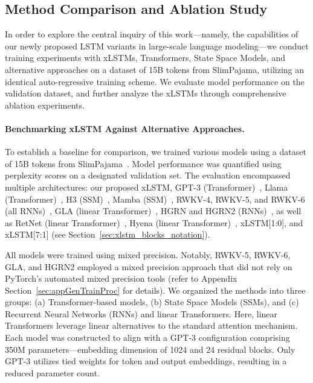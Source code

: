 \subsection{Method Comparison and Ablation Study}
\label{sec:ExpComparison}

In order to explore the central inquiry of this work—namely, the capabilities of our newly proposed LSTM variants in large-scale language modeling—we conduct training experiments with xLSTMs, Transformers, State Space Models, and alternative approaches on a dataset of 15B tokens from SlimPajama, utilizing an identical auto-regressive training scheme. We evaluate model performance on the validation dataset, and further analyze the xLSTMs through comprehensive ablation experiments.

\paragraph{Benchmarking xLSTM Against Alternative Approaches.} To establish a baseline for comparison, we trained various models using a dataset of 15B tokens from SlimPajama~\citep{Soboleva:23}. Model performance was quantified using perplexity scores on a designated validation set. The evaluation encompassed multiple architectures: our proposed xLSTM, GPT-3 (Transformer)~\citep{Brown:20short}, Llama (Transformer)~\citep{Touvron:23arxiv}, H3 (SSM)~\citep{Fu:23}, Mamba (SSM)~\citep{Gu:24arxiv}, RWKV-4, RWKV-5, and RWKV-6 (all RNNs)~\citep{Peng:23arxivshort, Peng:24arxivshort}, GLA (linear Transformer)~\citep{Yang:23arxiv}, HGRN and HGRN2 (RNNs)~\citep{Qin:23, Qin:24arxiv}, as well as RetNet (linear Transformer)~\citep{Sun:23arxiv}, Hyena (linear Transformer)~\citep{Poli:23}, xLSTM[1:0], and xLSTM[7:1] (see Section~\ref{sec:xlstm_blocks_notation}). 

All models were trained using mixed precision. Notably, RWKV-5, RWKV-6, GLA, and HGRN2 employed a mixed precision approach that did not rely on PyTorch's automated mixed precision tools (refer to Appendix Section~\ref{sec:appGenTrainProc} for details). We organized the methods into three groups: (a) Transformer-based models, (b) State Space Models (SSMs), and (c) Recurrent Neural Networks (RNNs) and linear Transformers. Here, linear Transformers leverage linear alternatives to the standard attention mechanism. Each model was constructed to align with a GPT-3 configuration comprising 350M parameters—embedding dimension of 1024 and 24 residual blocks. Only GPT-3 utilizes tied weights for token and output embeddings, resulting in a reduced parameter count. 

